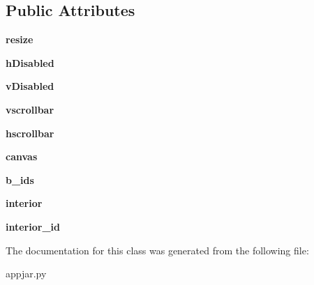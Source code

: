 \subsection*{Public Attributes}
\begin{DoxyCompactItemize}
\item 
\mbox{\label{class_python_01_g_u_i_1_1appjar_1_1_scroll_pane_aa945f135ee9b4cf442492c1b4037daab}} 
{\bfseries resize}
\item 
\mbox{\label{class_python_01_g_u_i_1_1appjar_1_1_scroll_pane_aa4cac471f65cac886338087af66abafb}} 
{\bfseries h\+Disabled}
\item 
\mbox{\label{class_python_01_g_u_i_1_1appjar_1_1_scroll_pane_a64cb012cba7c04c476ff72d7e0d6783b}} 
{\bfseries v\+Disabled}
\item 
\mbox{\label{class_python_01_g_u_i_1_1appjar_1_1_scroll_pane_ae955f5b3ae81cfd1839ab4859856128e}} 
{\bfseries vscrollbar}
\item 
\mbox{\label{class_python_01_g_u_i_1_1appjar_1_1_scroll_pane_a39ca116f7411a202f577abe9625d4109}} 
{\bfseries hscrollbar}
\item 
\mbox{\label{class_python_01_g_u_i_1_1appjar_1_1_scroll_pane_ae1414520ef2a36689455186cbcb1dd02}} 
{\bfseries canvas}
\item 
\mbox{\label{class_python_01_g_u_i_1_1appjar_1_1_scroll_pane_ac284f5914383891216e521eeb43321a9}} 
{\bfseries b\+\_\+ids}
\item 
\mbox{\label{class_python_01_g_u_i_1_1appjar_1_1_scroll_pane_affae83228a3b07e43c843fbd8532c454}} 
{\bfseries interior}
\item 
\mbox{\label{class_python_01_g_u_i_1_1appjar_1_1_scroll_pane_afff57a3bbada446bac2e8d3e6872fe2a}} 
{\bfseries interior\+\_\+id}
\end{DoxyCompactItemize}


The documentation for this class was generated from the following file\+:\begin{DoxyCompactItemize}
\item 
appjar.\+py\end{DoxyCompactItemize}

